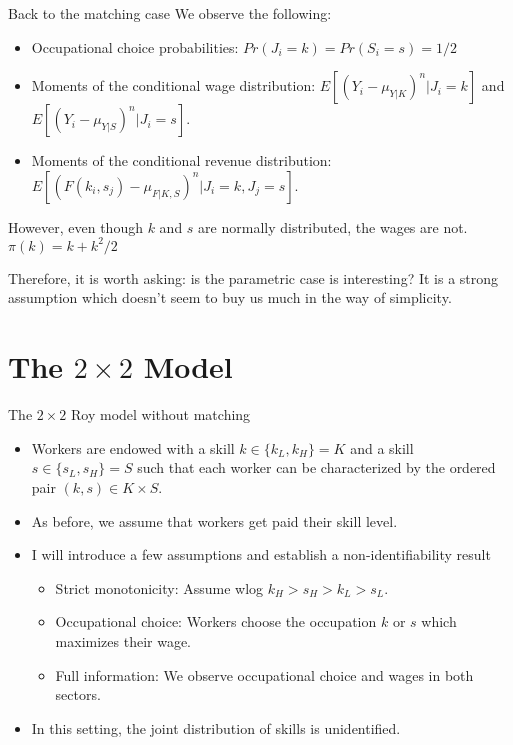 \documentclass[aspectratio=169]{beamer}
\begin{document}
\begin{frame}{Back to the matching case}
	We observe the following:
	\smallskip
\begin{itemize}
	\item Occupational choice probabilities: $Pr(J_i = k)=Pr(S_i = s)=1/2$
	\item Moments of the conditional wage distribution: $E[(Y_i - \mu_{Y|K})^n| J_i = k]$ and $E[(Y_i - \mu_{Y|S})^n| J_i = s]$.
	\item Moments of the conditional revenue distribution: $E[(F(k_i,s_j)-\mu_{F|K,S})^n|J_i = k,J_j = s]$.
\end{itemize}

\vspace{0.25cm}

However, even though $k$ and $s$ are normally distributed, the wages are not. $\pi(k)=k+k^2/2$

\vspace{0.5cm}

Therefore, it is worth asking: is the parametric case is interesting? It is a strong assumption which doesn't seem to buy us much in the way of simplicity.
\end{frame}


\section{The $2\times 2$ Model}

\begin{frame}{The $2\times 2$ Roy model without matching}
	\begin{itemize}
		\item Workers are endowed with a skill $k\in\{k_L,k_H\}=K$ and a skill $s\in\{s_L,s_H\}=S$ such that each worker can be characterized by the ordered pair $(k,s)\in K\times S$.
		\bigskip
		\item As before, we assume that workers get paid their skill level.
		\bigskip
		\item I will introduce a few assumptions and establish a non-identifiability result
		\begin{itemize}
			\item Strict monotonicity: Assume wlog $k_H > s_H > k_L > s_L$.
			\smallskip
			\item Occupational choice: Workers choose the occupation $k$ or $s$ which maximizes their wage.
			\smallskip
			\item Full information: We observe occupational choice and wages in both sectors.
		\end{itemize}
		\bigskip
		\item In this setting, the joint distribution of skills is unidentified.
	\end{itemize}
\end{frame}
\end{document}
